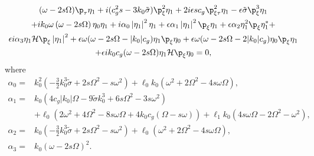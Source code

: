 \documentclass{JFM_Style/jfm}
\begin{document}
\begin{multline}
(\omega-2s\Omega)\p_{\tau}\eta_{1} + i(c_{g}^{2}s-3k_{0}\tilde{\sigma})\p_{\xi}^{2}\eta_{1} + 2i\epsilon s c_{g}\p^{2}_{\xi\tau}\eta_{1} - \epsilon\tilde{\sigma} \p^{3}_{\xi}\eta_{1} \\
+ ik_{0}\omega\left(\omega-2s\Omega\right)\eta_{0}\eta_{1} +
i \alpha_{0}\left|\eta_{1}\right|^{2}\eta_{1}
+ \epsilon\alpha_{1}\left|\eta_{1}\right|^{2}\p_{\xi}\eta_{1}
+ \epsilon\alpha_{2}\eta_{1}^{2}\p_{\xi}\eta^{\ast}_{1} + \\
\epsilon i\alpha_{3}\eta_{1}\mathcal{H}\p_{\xi}\left|\eta_{1}\right|^{2}
 + \epsilon \omega(\omega-2s\Omega-|k_{0}|c_{g})\eta_{1}\p_{\xi}\eta_{0} + \epsilon\omega(\omega-2s\Omega-2|k_{0}|c_{g})\eta_{0}\p_{\xi}\eta_{1} \\
+ \epsilon ik_{0}c_{g}(\omega-2s\Omega)\eta_{1}\mathcal{H}\p_{\xi}\eta_{0} = 0,
\label{mnls}
\end{multline}
where
\begin{align*}
\alpha_{0} = & k_{0}^{2}\left(-\frac{3}{2}k_{0}^{3}\tilde{\sigma} + 2s\Omega^{2}-s\omega^{2}\right) + \ell_{0}k_{0}\left(\omega^{2}+2\Omega^{2}-4s\omega\Omega\right),\\
\alpha_{1} = & k_{0}\left(4c_{g}|k_{0}|\Omega - 9\tilde{\sigma}k_{0}^{3}+6s\Omega^{2}-3s\omega^{2}\right) \\
& + \ell_{0} \left(2\omega^{2}+4\Omega^{2}-8s\omega\Omega+4k_{0}c_{g}(\Omega-s\omega)\right) + \ell_{1}k_{0}\left(4s\omega\Omega-2\Omega^{2}-\omega^{2}\right),\\
\alpha_{2} = & k_{0}\left(-\frac{3}{2}k_{0}^{3}\tilde{\sigma}+2s\Omega^{2}-s\omega^{2}\right)  + \ell_{0}\left(\omega^{2} + 2\Omega^{2}-4s\omega\Omega\right),\\
\alpha_{3} = & k_{0}\left(\omega-2s\Omega\right)^{2}.
\end{align*}
\end{document}
